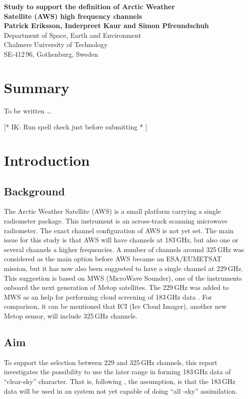 \documentclass[12pt]{article}
\begin{document}
\thispagestyle{empty}
\noindent
\textbf{\Large Study to support the definition of Arctic Weather \vspace{1mm}\\
Satellite (AWS) high frequency channels} \vspace{8mm}\\
{\bf Patrick Eriksson, Inderpreet Kaur and Simon Pfreundschuh}\\
Department of Space, Earth and Environment\\
Chalmers University of Technology\\
SE-412\,96, Gothenburg, Sweden\vspace{10mm}

\section*{Summary}
%
To be written \dots

[* IK: Run spell check just before submitting * ]


\setcounter{tocdepth}{1} 
\tableofcontents


\newpage
\setcounter{page}{1}

\section{Introduction}
%
\subsection{Background}
The Arctic Weather Satellite (AWS) is a small platform carrying a single
radiometer package. This instrument is an across-track scanning microwave
radiometer. The exact channel configuration of AWS is not yet set. The main
issue for this study is that AWS will have channels at 183\,GHz, but also one
or several channels a higher frequencies. A number of channels around 325\,GHz
was considered as the main option before AWS became an ESA/EUMETSAT mission,
but it has now also been suggested to have a single channel at 229\,GHz. This
suggestion is based on MWS (MicroWave Sounder), one of the instruments onboard
the next generation of Metop satellites. The 229\,GHz was added to MWS as an
help for performing cloud screening of 183\,GHz data
\citep{rekha2012potential}. For comparison, it can be mentioned that ICI (Ice
Cloud Imager), another new Metop sensor, will include 325\,GHz channels.

\subsection{Aim}
%
To support the selection between 229 and 325\,GHz channels, this report
investigates the possibility to use the later range in forming 183\,GHz data of
``clear-sky'' character. That is, following \citet{rekha2012potential}, the
assumption, is that the 183\,GHz data will be used in an system not yet
capable of doing ``all -sky'' assimilation.
\end{document}
